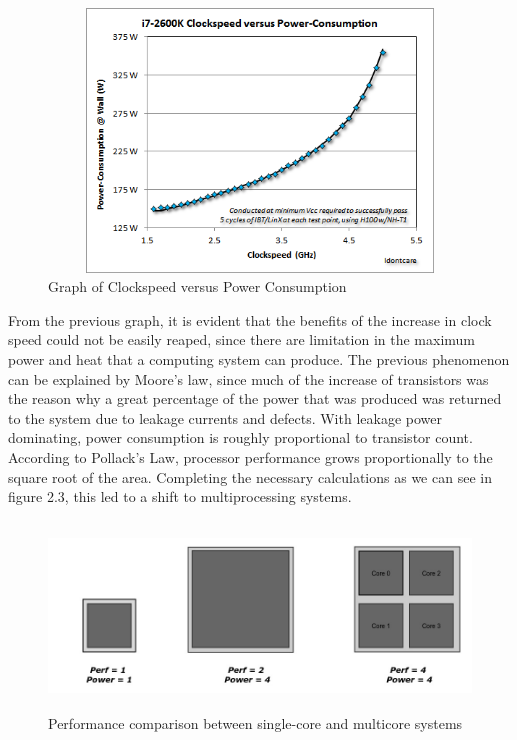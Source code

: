 \documentclass[diploma]{Styles/softlab-thesis}
\begin{document}
\begin{figure}[ht!]
\begin{center}
\includegraphics[width=130mm,height=70mm]{images/clock-vs-power.png}
\caption{Graph of Clockspeed versus Power Consumption \label{overflow}}
\end{center}
\end{figure}

From the previous graph, it is evident that the benefits of the increase in clock speed could not be easily reaped, since there are limitation in the maximum power and heat that a computing system can produce. The previous phenomenon can be explained by Moore's law, since much of the increase of transistors was the reason why a great percentage of the power that was produced was returned to the system due to leakage currents and defects. With leakage power dominating, power consumption is roughly proportional to transistor count. According to Pollack's Law, processor performance grows proportionally to the square root of the area. Completing the necessary calculations as we can see in figure 2.3, this led to a shift to multiprocessing systems.

\begin{figure}[ht!]
\begin{center}
\includegraphics[width=150mm, height=50mm]{images/multicore.jpg}
\caption{Performance comparison between single-core and multicore systems \label{overflow}}
\end{center}
\end{figure}
\end{document}
